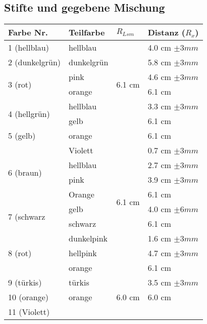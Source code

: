 \documentclass[11pt,paper=a4,final]{scrartcl}
\begin{document}
\subsection{Stifte und gegebene Mischung}
\begin{savenotes} %
  \begin{table}[ht!]
    \centering
    \begin{tabular}{|l|l|l|l|}
      \hline
    \bf Farbe Nr.	& \bf Teilfarbe	& \bf \(R_{Lsm}\)		& \bf Distanz (\(R_x\))	\\ \hline
      1 (hellblau)	& hellblau	& \multirow{6}{*}{6.1 cm }	& 4.0 cm \(\pm 3 mm \)	\\ \cline{1-2} \cline{4-4}
      2 (dunkelgr\"un)	& dunkelgr\"un	&				& 5.8 cm \(\pm 3 mm \)	\\ \cline{1-2} \cline{4-4}
      \multirow{2}{*}{3 (rot) }
			& pink		&				& 4.6 cm \(\pm 3 mm \)	\\ 
			& orange	&				& 6.1 cm 		\\ \cline{1-2} \cline{4-4}
      \multirow{2}{*}{4 (hellgr\"un) }
 			& hellblau	&				& 3.3 cm \(\pm 3 mm \)	\\
			& gelb		&				& 6.1 cm		\\ \hline
      5 (gelb)		& orange	& \multirow{10}{*}{6.1 cm }	& 6.1 cm		\\ \cline{1-2} \cline{4-4}
      \multirow{4}{*}{6 (braun)}
			& Violett	&				& 0.7 cm \(\pm 3 mm \)	\\
			& hellblau	&				& 2.7 cm \(\pm 3 mm \)	\\
      			& pink		&				& 3.9 cm \(\pm 3 mm \)	\\
      			& Orange	&				& 6.1 cm 		\\ \cline{1-2} \cline{4-4}
      \multirow{2}{*}{7 (schwarz}
      			& gelb		&				& 4.0 cm \(\pm 6 mm \)	\\
      			& schwarz	&				& 6.1 cm		\\ \cline{1-2} \cline{4-4}
      \multirow{3}{*}{8 (rot)}
      			& dunkelpink	& 				& 1.6 cm \(\pm 3 mm \)	\\ 
      			& hellpink	&				& 4.7 cm \(\pm 3 mm \)	\\
      			& orange	&				& 6.1 cm		\\ \hline
      9 (t\"urkis)	& t\"urkis	& \multirow{6}{*}{6.0 cm }	& 3.5 cm \(\pm 3 mm \)	\\ \cline{1-2} \cline{4-4}
       10 (orange)	& orange	& 				& 6.0 cm		\\ \cline{1-2} \cline{4-4}
      \multirow{3}{*}{11 (Violett)}

\end{tabular}
\end{table}
\end{savenotes}
\end{document}
